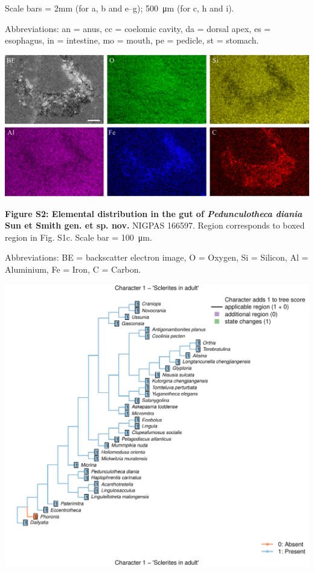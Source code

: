 \documentclass[openany]{book}
\theoremstyle{definition}
\theoremstyle{definition}
\theoremstyle{definition}
\theoremstyle{remark}
\begin{document}
Scale bars = 2mm (for a, b and e--g); 500~μm (for c, h and i).

Abbreviations: an = anus, cc = coelomic cavity, da = dorsal apex, es =
esophagus, in = intestine, mo = mouth, pe = pedicle, st = stomach.

\begin{center}\includegraphics[width=0.8\linewidth]{images/image2} \end{center}

\textbf{Figure S2: Elemental distribution in the gut of
\emph{Pedunculotheca diania} Sun et Smith gen. et sp. nov.} NIGPAS
166597. Region corresponds to boxed region in Fig. S1c. Scale bar =
100~μm.

Abbreviations: BE = backscatter electron image, O = Oxygen, Si =
Silicon, Al = Aluminium, Fe = Iron, C = Carbon.

\includegraphics{Brachiopod_phylogeny_files/figure-latex/unnamed-chunk-4-1.pdf}
\end{document}
